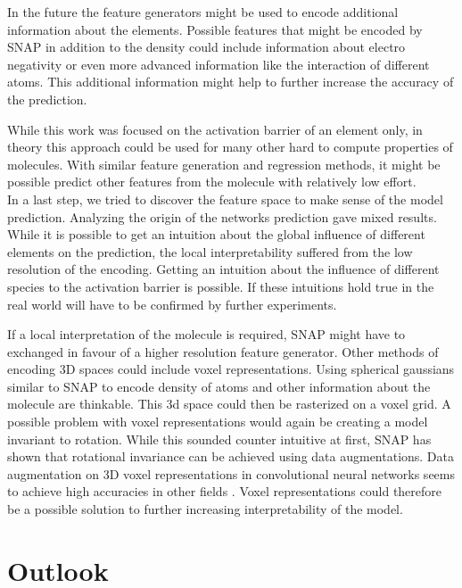 In the future the feature generators might be used to encode additional information about the elements.
Possible features that might be encoded by SNAP in addition to the density could include information about 
electro negativity or even more advanced information like the interaction of different atoms.
This additional information might help to further increase the accuracy of the prediction.

While this work was focused on the activation barrier of an element only,
in theory this approach could be used for many other hard to compute properties of molecules.
With similar feature generation and regression methods, it might be possible 
predict other features from the molecule with relatively low effort.
\\

In a last step, we tried to discover the feature space to make sense of the model prediction.
Analyzing the origin of the networks prediction gave mixed results.
While it is possible to get an intuition about the global influence of different elements on
the prediction, the local interpretability suffered from the low resolution of the encoding.
Getting an intuition about the influence of different species to the activation barrier is possible.
If these intuitions hold true in the real world will have to be confirmed by further experiments.

If a local interpretation of the molecule is required, SNAP might have to exchanged in favour of a higher resolution 
feature generator.
Other methods of encoding 3D spaces could include voxel representations.
Using spherical gaussians similar to SNAP to encode density of atoms and other information about the molecule are thinkable.
This 3d space could then be rasterized on a voxel grid.
A possible problem with voxel representations would again be creating a model invariant to rotation.
While this sounded counter intuitive at first, SNAP has shown that rotational invariance can be achieved using data augmentations.
Data augmentation on 3D voxel representations in convolutional neural networks seems to achieve high accuracies in 
other fields \cite{7353481}.
Voxel representations could therefore be a possible solution to further increasing interpretability of the model.

\section{Outlook}

